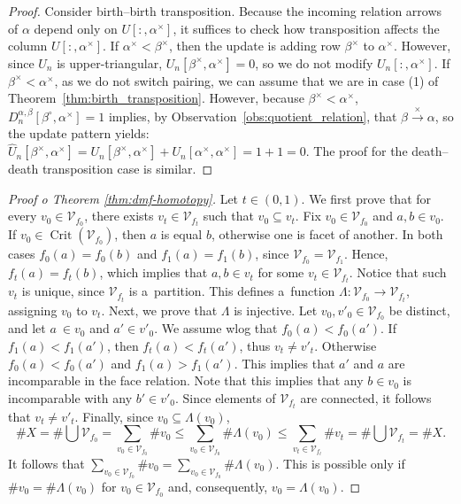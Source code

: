 \documentclass[a4paper,12pt, USenglish,cleveref,autoref,thm-restate]{article}
\newcommand{\mU}{U}
\newcommand{\hmU}{\mU}
\newcommand{\hmUaft}{\hat{\mU}}
\newcommand{\hmUbef}{\mU}
\newcommand{\mD}{D}
\newcommand{\bth}[1]{#1^\circ}
\newcommand{\dth}[1]{#1^{\!\times}}
\newcommand{\homo}{\xrightarrow{\times}}
\newcommand{\bds}{\alpha}
\newcommand{\bdt}{\beta}
\newcommand{\cV}{\mathcal{V}}
\def\card#1{\##1}
\DeclareMathOperator{\crit}{Crit}
\begin{document}
\begin{appendices}
\begin{proof}
      \noindent Consider birth--birth transposition. Because the incoming relation arrows of $\bds$ depend only on $\hmU[:,\dth\bds]$, it suffices to check how transposition affects the column $\hmU[:,\dth\bds]$. If $\dth\bds < \dth\bdt$, then the update is adding row $\dth\bdt$ to $\dth\bds$. However, since $\hmU_{n}$ is upper-triangular, $\hmU_{n}[\dth\bdt,\dth\bds] = 0$, so we do not modify $\hmU_{n}[:,\dth\bds]$.  If $\dth\bdt < \dth\bds$, as we do not switch pairing, we can assume that we are in case (1) of Theorem~\ref{thm:birth_transposition}. However, because $\dth\bdt < \dth\bds$, $\mD_{n}^{\bds,\bdt}[\bth\bdt,\dth\bds] = 1$ implies, by Observation~\ref{obs:quotient_relation}, that $\bdt \homo \bds$, so the update pattern yields:   $\hmUaft_{n}[\dth\bdt,\dth\bds] = \hmUbef_{n}[\dth\bdt,\dth\bds]+\hmUbef_{n}[\dth\bds,\dth\bds] = 1 + 1 = 0.$ The proof for the death--death transposition case is similar. 
\end{proof}


\DmfHomotopy*

\begin{proof}[Proof o Theorem \ref{thm:dmf-homotopy}]
    Let $t \in (0,1)$. We first prove that for every $v_0 \in \cV_{f_0}$, there exists $v_t \in \cV_{f_t}$ such that $v_0 \subseteq v_t$. Fix $v_0 \in \cV_{f_0}$ and $a, b \in v_0$.
    If $v_0 \in \crit(\cV_{f_0})$, then $a$ is equal $b$, otherwise one is facet of another. In both cases $f_0(a)=f_0(b)$ and $f_1(a)=f_1(b)$, since $\cV_{f_0}=\cV_{f_1}$. Hence, $f_t(a)=f_t(b)$, which implies that $a, b \in v_t$ for some $v_t \in \cV_{f_t}$. Notice that such $v_t$ is unique, since $\cV_{f_t}$ is a~partition.
    This defines a~function $\Lambda \colon \cV_{f_0} \to \cV_{f_t}$, assigning $v_0$ to $v_t$. Next, we prove that $\Lambda$ is injective. Let $v_0, v'_0 \in \cV_{f_0}$ be distinct, and let $a~\in v_0$ and $a' \in v'_0$. We assume wlog that $f_0(a) < f_0(a')$. If $f_1(a) < f_1(a')$, then $f_t(a) < f_t(a')$, thus $v_t \neq v'_t$. Otherwise $f_0(a) < f_0(a')$ and $f_1(a) > f_1(a')$. This implies that $a'$ and $a$ are incomparable in the face relation. Note that this implies that any $b \in v_0$ is incomparable with any $b' \in v'_0$. Since elements of $\cV_{f_t}$ are connected, it follows that $v_t \neq v'_t$. Finally, since $v_0 \subseteq \Lambda(v_0)$,
%
    \[
        \card{X}=\card{\bigcup \cV_{f_0}}=
        \sum_{v_0 \in \cV_{f_0}} \card{v_0}\leq
        \sum_{v_0 \in \cV_{f_0}} \card{\Lambda(v_0)}\leq
        \sum_{v_t \in \cV_{f_t}} \card{v_t}=
        \card{\bigcup \cV_{f_t}}=\card{X}.
    \]
%
    It follows that $\sum_{v_0 \in \cV_{f_0}} \card{v_0} = \sum_{v_0 \in \cV_{f_0}} \card{\Lambda(v_0)}$. This is possible only if $\card{v_0} = \card{\Lambda(v_0)}$ for $v_0 \in \cV_{f_0}$ and, consequently, $v_0=\Lambda(v_0)$.    
\end{proof}


\end{appendices}
\end{document}
